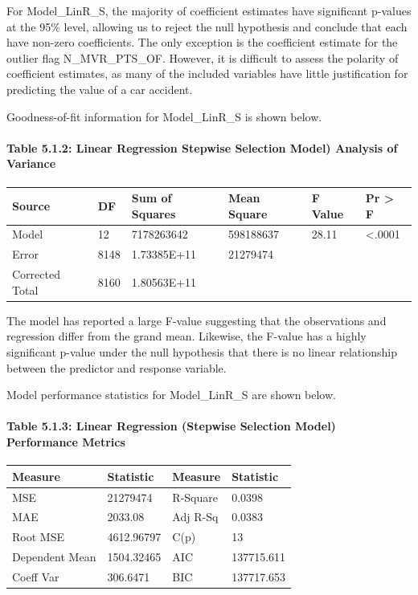 \documentclass[]{article}
\let\oldparagraph\paragraph
\renewcommand{\paragraph}[1]{\oldparagraph{#1}\mbox{}}
\begin{document}
For Model\_LinR\_S, the majority of coefficient estimates have
significant p-values at the 95\% level, allowing us to reject the null
hypothesis and conclude that each have non-zero coefficients. The only
exception is the coefficient estimate for the outlier flag
N\_MVR\_PTS\_OF. However, it is difficult to assess the polarity of
coefficient estimates, as many of the included variables have little
justification for predicting the value of a car accident.

Goodness-of-fit information for Model\_LinR\_S is shown below.

\paragraph{Table 5.1.2: Linear Regression Stepwise Selection Model)
Analysis of
Variance}\label{table-5.1.2-linear-regression-stepwise-selection-model-analysis-of-variance}

\begin{longtable}[]{@{}llllll@{}}
\toprule
Source & DF & Sum of Squares & Mean Square & F Value & Pr \textgreater{}
F\tabularnewline
\midrule
\endhead
Model & 12 & 7178263642 & 598188637 & 28.11 &
\textless{}.0001\tabularnewline
Error & 8148 & 1.73385E+11 & 21279474 & &\tabularnewline
Corrected Total & 8160 & 1.80563E+11 & & &\tabularnewline
\bottomrule
\end{longtable}

The model has reported a large F-value suggesting that the observations
and regression differ from the grand mean. Likewise, the F-value has a
highly significant p-value under the null hypothesis that there is no
linear relationship between the predictor and response variable.

Model performance statistics for Model\_LinR\_S are shown below.

\paragraph{Table 5.1.3: Linear Regression (Stepwise Selection Model)
Performance
Metrics}\label{table-5.1.3-linear-regression-stepwise-selection-model-performance-metrics}

\begin{longtable}[]{@{}llll@{}}
\toprule
Measure & Statistic & Measure & Statistic\tabularnewline
\midrule
\endhead
MSE & 21279474 & R-Square & 0.0398\tabularnewline
MAE & 2033.08 & Adj R-Sq & 0.0383\tabularnewline
Root MSE & 4612.96797 & C(p) & 13\tabularnewline
Dependent Mean & 1504.32465 & AIC & 137715.611\tabularnewline
Coeff Var & 306.6471 & BIC & 137717.653\tabularnewline
\bottomrule
\end{longtable}
\end{document}
